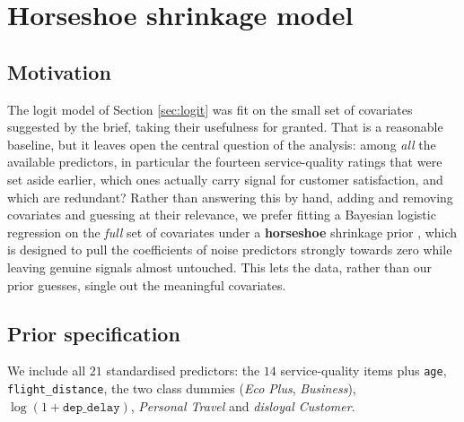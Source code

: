 \section{Horseshoe shrinkage model}
\label{sec:regression}

\subsection{Motivation}
The logit model of Section \ref{sec:logit} was fit on the small set of
covariates suggested by the brief, taking their usefulness for granted. That is
a reasonable baseline, but it leaves open the central question of the analysis:
among \emph{all} the available predictors, in particular the fourteen
service-quality ratings that were set aside earlier, which ones actually carry
signal for customer satisfaction, and which are redundant? Rather than answering
this by hand, adding and removing covariates and guessing at their relevance, we
prefer fitting a Bayesian logistic regression on the \emph{full} set of covariates under a \textbf{horseshoe} shrinkage prior \cite{bl_book}, which is designed to pull the coefficients of
noise predictors strongly towards zero while leaving genuine signals almost
untouched. This lets the data, rather than our prior guesses, single out the
meaningful covariates.

\subsection{Prior specification}
We include all $21$ standardised predictors: the $14$ service-quality items
plus \texttt{age}, \texttt{flight\_distance}, the two class dummies
(\textit{Eco Plus}, \textit{Business}), $\log(1+\texttt{dep\_delay})$,
\textit{Personal Travel} and \textit{disloyal Customer}.


